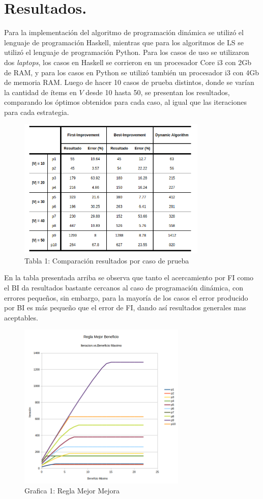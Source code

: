 \documentclass{ci5652}
\begin{document}
\section{Resultados.}
	Para la implementación del algoritmo de programación dinámica se utilizó el lenguaje de programación Haskell, mientras que para los algoritmos de LS se utilizó el lenguaje de programación Python. Para los casos de uso se utilizaron dos \textit{laptops}, los casos en Haskell se corrieron en un procesador Core i3 con 2Gb de RAM, y para los casos en Python se utilizó también un procesador i3 con 4Gb de memoria RAM. Luego de hacer 10 casos de prueba distintos, donde se varían la cantidad de ítems en $V$ desde 10 hasta 50, se presentan los resultados, comparando los óptimos obtenidos para cada caso, al igual que las iteraciones para cada estrategia.\\

 	\begin{figure}[h]
	 	\caption{Tabla 1: Comparación resultados por caso de prueba}
		\includegraphics[width=9cm]{errores.png}
	\end{figure}

	En la tabla presentada arriba se observa que tanto el acercamiento por FI como el BI da resultados bastante cercanos al caso de programación dinámica, con errores pequeños, sin embargo, para la mayoría de los casos el error producido por BI es más pequeño que el error de FI, dando así resultados generales mas aceptables.\\

 	\begin{figure}[h]
 	\caption{Grafica 1: Regla Mejor Mejora}
	\includegraphics[width=8cm, height=8cm]{best_imp-it-vs-ben_max.png}
	\end{figure}
\end{document}
